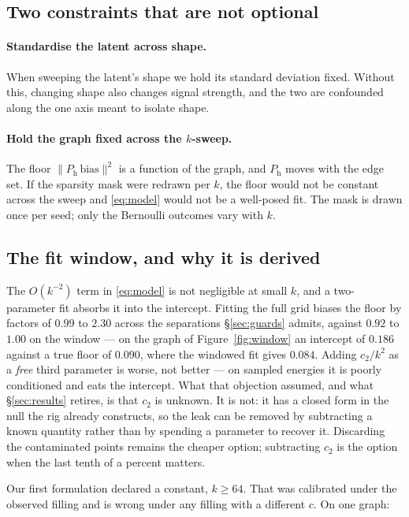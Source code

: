 \documentclass[11pt,a4paper]{article}
\newcommand{\Ph}{P_{\mathrm{h}}}
\begin{document}
\subsection{Two constraints that are not optional}

\paragraph{Standardise the latent across shape.} When sweeping the latent's shape
we hold its standard deviation fixed. Without this, changing shape also changes
signal strength, and the two are confounded along the one axis meant to isolate
shape.

\paragraph{Hold the graph fixed across the $k$-sweep.} The floor
$\|\Ph\,\text{bias}\|^2$ is a function of the graph, and $\Ph$ moves with the
edge set. If the sparsity mask were redrawn per $k$, the floor would not be
constant across the sweep and \eqref{eq:model} would not be a well-posed fit. The
mask is drawn once per seed; only the Bernoulli outcomes vary with $k$.

\subsection{The fit window, and why it is derived}\label{subsec:window}

The $O(k^{-2})$ term in \eqref{eq:model} is not negligible at small $k$, and a
two-parameter fit absorbs it into the intercept. Fitting the full grid biases the
floor by factors of $0.99$ to $2.30$ across the separations \S\ref{sec:guards}
admits, against $0.92$ to $1.00$ on the window --- on the graph of
Figure~\ref{fig:window} an intercept of $0.186$ against a true floor of $0.090$,
where the windowed fit gives $0.084$. Adding $c_2/k^2$ as a \emph{free} third
parameter is worse, not better --- on sampled energies it is poorly conditioned
and eats the intercept. What that objection assumed, and what \S\ref{sec:results}
retires, is that $c_2$ is unknown. It is not: it has a closed form in the null
the rig already constructs, so the leak can be removed by subtracting a known
quantity rather than by spending a parameter to recover it. Discarding the
contaminated points remains the cheaper option; subtracting $c_2$ is the option
when the last tenth of a percent matters.

Our first formulation declared a constant, $k \geq 64$. That was calibrated under
the observed filling and is wrong under any filling with a different $c$. On one
graph:
\end{document}
